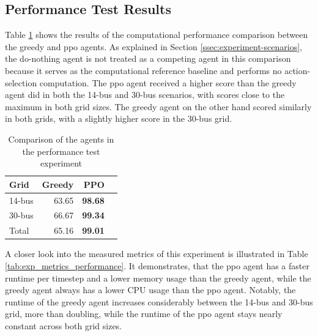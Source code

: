 \subsection{Performance Test Results}\label{ssec:perf-test-result}
Table \ref{tab:exp_overview_performance} shows the results of the computational performance comparison between the greedy and \ac{ppo} agents. As explained in Section \ref{ssec:experiment-scenarios}, the do-nothing agent is not treated as a competing agent in this comparison because it serves as the computational reference baseline and performs no action-selection computation. The \ac{ppo} agent received a higher score than the greedy agent did in both the 14-bus and 30-bus scenarios, with scores close to the maximum in both grid sizes. The greedy agent on the other hand scored similarly in both grids, with a slightly higher score in the 30-bus grid.

\begin{table}[htbp]
\centering
\caption{Comparison of the agents in the performance test experiment}
\label{tab:exp_overview_performance}
\begin{tabular}{lrrr}
    \toprule
    Grid & Greedy & PPO \\
    \midrule
    14-bus & 63.65 & \textbf{98.68} \\
    30-bus & 66.67 & \textbf{99.34} \\
    \midrule
    Total & 65.16 & \textbf{99.01} \\
    \bottomrule
\end{tabular}
\end{table}

A closer look into the measured metrics of this experiment is illustrated in Table \ref{tab:exp_metrics_performance}. It demonstrates, that the \ac{ppo} agent has a faster runtime per timestep and a lower memory usage than the greedy agent, while the greedy agent always has a lower CPU usage than the \ac{ppo} agent. Notably, the runtime of the greedy agent increases considerably between the 14-bus and 30-bus grid, more than doubling, while the runtime of the \ac{ppo} agent stays nearly constant across both grid sizes. 

